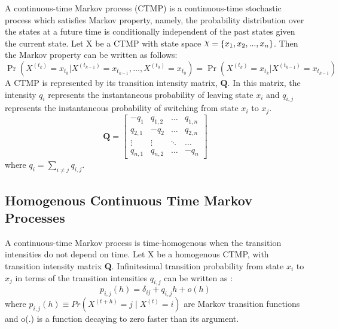 A continuous-time Markov process (CTMP) is a continuous-time stochastic process which satisfies Markov property, namely, the probability distribution over the states at a future time is conditionally independent of the past states given the current state.\cite{Cohn2010a} Let X be a CTMP with state space $ \rchi = \left\lbrace x_{1}, x_{2}, ..., x_{n} \right\rbrace  $. Then the Markov property can be written as follows:
\begin{equation}
	\operatorname{Pr}\left(X^{\left(t_{k}\right)}=x_{t_{k}} | X^{\left(t_{k-1}\right)}=x_{t_{k-1}}, \ldots, X^{\left(t_{0}\right)}=x_{t_{0}}\right)=\operatorname{Pr}\left(X^{\left(t_{k}\right)}=x_{t_{k}} | X^{\left(t_{k-1}\right)}=x_{t_{k-1}}\right)
\end{equation}
A CTMP is represented by its transition intensity matrix, $ \textbf{Q} $. In this matrix, the intensity $ q_{i} $ represents the instantaneous probability of leaving state $ x_{i} $ and $ q_{i,j} $ represents the instantaneous probability of switching from state $ x_{i} $ to $ x_{j} $. 
\begin{equation}
	\textbf{Q} = 
	\begin{bmatrix}
	-q_{1} & q_{1,2} & 	{\hdots}  & q_{1,n} \\
	q_{2,1} & -q_{2} & 	{\hdots}  & q_{2,n}  \\
	{\vdots}  & 	{\vdots}  & 	{\ddots}  & {\hdots}  \\
	q_{n,1} &  q_{n,2} &  {\hdots} & -q_{n}
	\end{bmatrix}
\end{equation}
where $ q_{i} = \sum_{i \neq j} q_{i,j}$.\cite{Nodelman1995}

\subsection{Homogenous Continuous Time Markov Processes}
A continuous-time Markov process is time-homogenous when the transition intensities do not depend on time. Let X be a homogenous CTMP, with transition intensity matrix \textbf{Q}. Infinitesimal transition probability from state $ x_{i} $ to $ x_{j} $ in terms of the transition intensities $ q_{i,j} $ can be written as \cite{Cohn2010a}:
\begin{equation}
p_{i,j}(h)=\delta_{ij}+q_{i,j} h+o(h)
\end{equation}
where $ p_{i, j}(h) \equiv Pr(X^{(t+h)}=j\mid X^{(t)}=i) $ are Markov transition functions and o(.) is a function decaying to zero faster than its argument.

